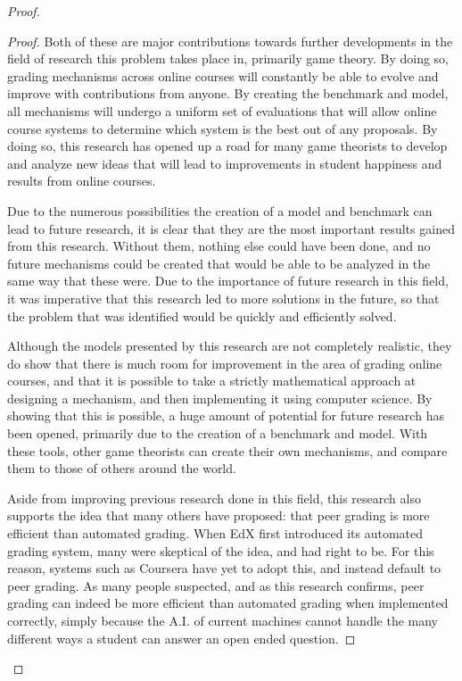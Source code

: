 \documentclass[12pt, Arial]{article}
\begin{document}
\begin{proof}
\begin{proof}
Both of these are major contributions towards further developments in the field of research this problem takes place in, primarily game theory. By doing so, grading mechanisms across online courses will constantly be able to evolve and improve with contributions from anyone. By creating the benchmark and model, all mechanisms will undergo a uniform set of evaluations that will allow online course systems to determine which system is the best out of any proposals. By doing so, this research has opened up a road for many game theorists to develop and analyze new ideas that will lead to improvements in student happiness and results from online courses.

Due to the numerous possibilities the creation of a model and benchmark can lead to future research, it is clear that they are the most important results gained from this research. Without them, nothing else could have been done, and no future mechanisms could be created that would be able to be analyzed in the same way that these were. Due to the importance of future research in this field, it was imperative that this research led to more solutions in the future, so that the problem that was identified would be quickly and efficiently solved.

Although the models presented by this research are not completely realistic, they do show that there is much room for improvement in the area of grading online courses, and that it is possible to take a strictly mathematical approach at designing a mechanism, and then implementing it using computer science. By showing that this is possible, a huge amount of potential for future research has been opened, primarily due to the creation of a benchmark and model. With these tools, other game theorists can create their own mechanisms, and compare them to those of others around the world.

Aside from improving previous research done in this field, this research also supports the idea that many others have proposed: that peer grading is more efficient than automated grading. When EdX first introduced its automated grading system, many were skeptical of the idea, and had right to be. For this reason, systems such as Coursera have yet to adopt this, and instead default to peer grading. As many people suspected, and as this research confirms, peer grading can indeed be more efficient than automated grading when implemented correctly, simply because the A.I. of current machines cannot handle the many different ways a student can answer an open ended question.


\end{proof}
\end{proof}
\end{document}
